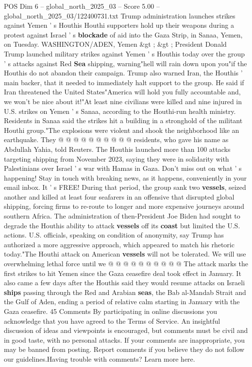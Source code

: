 \begin{textsample}{POS Dim 6 – global\_north\_2025\_03 – Score 5.00 – global\_north\_2025\_03/122400731.txt}  \label{ex:f6_pos_226}
Trump administration launches strikes against Yemen ' s Houthis Houthi supporters hold up their weapons during a protest against Israel ' s \textbf{blockade} of aid into the Gaza Strip, in Sanaa, Yemen, on Tuesday.
WASHINGTON/ADEN, Yemen \&gt ; \&gt ; President Donald Trump launched military strikes against Yemen ' s Houthis today over the group ' s attacks against Red \textbf{Sea} shipping, warning"hell will rain down upon you"if the Houthis do not abandon their campaign.
Trump also warned Iran, the Houthis ' main backer, that it needed to immediately halt support to the group.
He said if Iran threatened the United States"America will hold you fully accountable and, we won't be nice about it!"At least nine civilians were killed and nine injured in U.S. strikes on Yemen ' s Sanaa, according to the Houthi-run health ministry.
Residents in Sanaa said the strikes hit a building in a stronghold of the militant Houthi group."The explosions were violent and shook the neighborhood like an earthquake.
They @ @ @ @ @ @ @ @ @ @ residents, who gave his name as Abdullah Yahia, told Reuters.
The Houthis launched more than 100 attacks targeting shipping from November 2023, saying they were in solidarity with Palestinians over Israel ' s war with Hamas in Gaza.
Don't miss out on what ' s happening!
Stay in touch with breaking news, as it happens, conveniently in your email inbox.
It ' s FREE!
During that period, the group sank two \textbf{vessels}, seized another and killed at least four seafarers in an offensive that disrupted global shipping, forcing firms to re-route to longer and more expensive journeys around southern Africa.
The administration of then-President Joe Biden had sought to degrade the Houthis ability to attack \textbf{vessels} off its \textbf{coast} but limited the U.S. actions.
U.S. officials, speaking on condition of anonymity, say Trump has authorized a more aggressive approach, which appeared to match his rhetoric today."The Houthi attack on American \textbf{vessels} will not be tolerated.
We will use overwhelming lethal force until we @ @ @ @ @ @ @ @ @ @ The attack marks the first strikes to hit Yemen since the Gaza ceasefire deal took effect in January.
It also came a few days after the Houthis said they would resume attacks on Israeli \textbf{ships} passing through the Red and Arabian \textbf{seas}, the Bab al-Mandab Strait and the Gulf of Aden, ending a period of relative calm starting in January with the Gaza ceasefire. 45 Comments By participating in online discussions you acknowledge that you have agreed to the Terms of Service.
An insightful discussion of ideas and viewpoints is encouraged, but comments must be civil and in good taste, with no personal attacks.
If your comments are inappropriate, you may be banned from posting.
Report comments if you believe they do not follow our guidelines.Having trouble with comments?
Learn more here.

\end{textsample}
